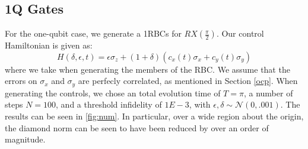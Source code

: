 \documentclass[aps,nofootinbib,pra,notitlepage,twocolumn]{revtex4-1}
\begin{document}
\subsection{1Q Gates}\label{1Q Gates}
 For the one-qubit case, we generate a 1RBCs for $RX(\frac{\pi}{2})$. Our control Hamiltonian is given as:
\begin{equation}\label{eq:1Qham}
  H(\delta, \epsilon, t) = \epsilon\sigma_z + (1 + \delta)(c_x(t)\sigma_x + c_y(t)\sigma_y)
\end{equation}
where we take  when generating the members of the RBC. We assume that the errors on $\sigma_x$ and $\sigma_y$ are perfecly correlated, as mentioned in Section \ref{ocp}. When generating the controls, we chose an total evolution time of $T=\pi$, a number of steps $N=100$, and a threshold infidelity of $1E-3$, with $\epsilon, \delta \sim \mathcal{N}(0, .001)$. The results can be seen in \ref{fig:num}. In particular, over a wide region about the origin, the diamond norm can be seen to have been reduced by over an order of magnitude.
\end{document}

